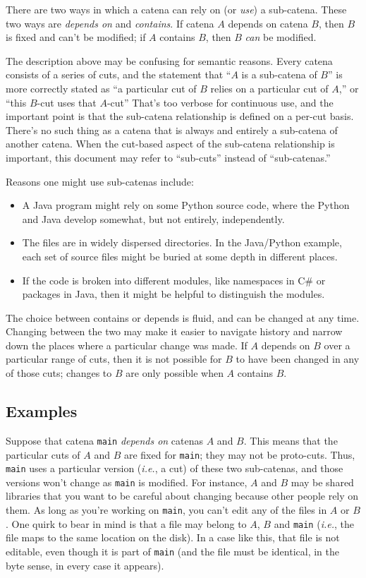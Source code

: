 \documentclass[10pt]{article}
\begin{document}
There are two ways in which a catena can rely on (or {\it use}) a
sub-catena. These two ways are {\it depends on} and {\it contains}. If
catena $A$ depends on catena $B$, then $B$ is fixed and can't be
modified; if $A$ contains $B$, then $B$ {\it can} be modified.

The description above may be confusing for semantic reasons. Every
catena consists of a series of cuts, and the statement that ``$A$ is a
sub-catena of $B$'' is more correctly stated as ``a particular cut
of $B$ relies on a particular cut of $A$,'' or ``this $B$-cut uses that
$A$-cut'' That's too verbose for continuous use, and the important
point is that the sub-catena relationship is defined on a per-cut
basis. There's no such thing as a catena that is always and entirely a
sub-catena of another catena. When the cut-based aspect of the
sub-catena relationship is important, this document may refer to
``sub-cuts'' instead of ``sub-catenas.'' 

Reasons one might use sub-catenas include:
\begin{itemize}
\item A Java program might rely on some Python source code, where the
  Python and Java develop somewhat, but not entirely, independently.
\item The files are in widely dispersed directories. In the
  Java/Python example, each set of source files might be buried at
  some depth in different places.
\item If the code is broken into different modules, like namespaces in
  C\# or packages in Java, then it might be helpful to distinguish
  the modules. 
\end{itemize}

The choice between contains or depends is fluid, and can
be changed at any time. Changing between the two may make it easier to
navigate history and narrow down the places where a particular change
was made. If $A$ depends on $B$ over a particular range of cuts, then
it is not possible for $B$ to have been changed in any of those cuts;
changes to $B$ are only possible when $A$ contains $B$. 

\subsection*{Examples}

Suppose that catena {\tt main} {\it depends on} catenas $A$ and $B$.
This means that the particular cuts of $A$ and $B$ are fixed for
{\tt main}; they may not be proto-cuts. Thus, {\tt main} uses a particular
version ({\it i.e.}, a cut) of these two sub-catenas, and those
versions won't change as {\tt main} is modified. For instance, $A$ and
$B$ may be shared libraries that you want to be careful about changing because
other people rely on them. As long as you're working on {\tt main},
you can't edit any of the files in $A$ or $B$. One quirk to bear in
mind is that a file may belong to $A$, $B$ and {\tt main} ({\it i.e.},
the file maps to the same location on the disk). 
In a case like this, that file is not editable, even though it is part of
{\tt main} (and the file must be identical, in the byte sense, in
every case it appears).
\end{document}
